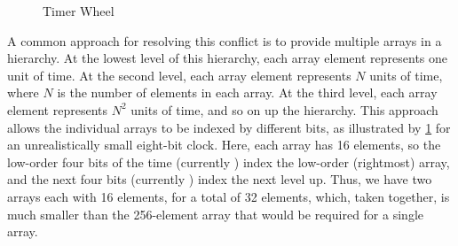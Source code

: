 \begin{figure}
\centering
{}
\caption{Timer Wheel}
\label{fig:advsync:Timer Wheel}
\end{figure}

A common approach for resolving this conflict is to provide multiple
arrays in a hierarchy.
At the lowest level of this hierarchy, each array element represents
one unit of time.
At the second level, each array element represents $N$ units of time,
where $N$ is the number of elements in each array.
At the third level, each array element represents $N^2$ units of time,
and so on up the hierarchy.
This approach allows the individual arrays to be indexed by different
bits, as illustrated by
\cref{fig:advsync:Timer Wheel}
for an unrealistically small eight-bit clock.
Here, each array has 16 elements, so the low-order four bits of the time
(currently ) index the low-order (rightmost) array, and the
next four bits (currently ) index the next level up.
Thus, we have two arrays each with 16 elements, for a total of 32 elements,
which, taken together, is much smaller than the 256-element array that
would be required for a single array.

